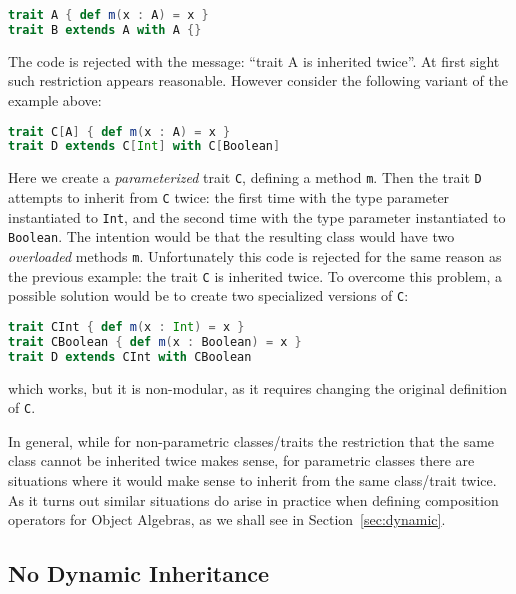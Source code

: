 \begin{lstlisting}[language=scala]
trait A { def m(x : A) = x }
trait B extends A with A {}
\end{lstlisting}

\noindent The code is rejected with the message: ``trait A is
inherited twice''. At first sight such restriction appears
reasonable. However consider the following variant of the example 
above:

\begin{lstlisting}[language=scala]
trait C[A] { def m(x : A) = x }
trait D extends C[Int] with C[Boolean]
\end{lstlisting}

\noindent Here we create a \emph{parameterized} trait \lstinline{C},
defining a method \lstinline{m}. Then the trait \lstinline{D} attempts 
to inherit from \lstinline{C} twice: the first time with the type
parameter instantiated to \lstinline{Int}, and the second time with
the type parameter instantiated to \lstinline{Boolean}. The intention 
would be that the resulting class would have two \emph{overloaded}
methods \lstinline{m}. Unfortunately this code is rejected for the
same reason as the previous example: the trait \lstinline{C} is
inherited twice. To overcome this problem, a possible solution would
be to create two specialized versions of \lstinline{C}:

\begin{lstlisting}[language=scala]
trait CInt { def m(x : Int) = x }
trait CBoolean { def m(x : Boolean) = x }
trait D extends CInt with CBoolean
\end{lstlisting}

\noindent which works, but it is non-modular, as it requires changing 
the original definition of \lstinline{C}. 

In general, while for non-parametric classes/traits the restriction
that the same class cannot be inherited twice makes sense, for parametric
classes there are situations where it would make sense to inherit 
from the same class/trait twice. As it turns out similar situations 
do arise in practice when defining composition operators for
Object Algebras, as we shall see in Section~\ref{sec:dynamic}.

\subsection{No Dynamic Inheritance}
\label{sec:scala-merge}

